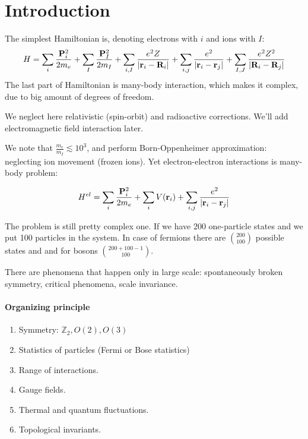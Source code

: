 \section{Introduction}
The simplest Hamiltonian is, denoting electrons with $i$ and ions with $I$: 
\begin{align}
H = \sum_i \frac{\vb{P}_i^2}{2m_e} +  \sum_I \frac{\vb{P}_I^2}{2m_I} +  \sum_{i,I} \frac{e^2Z}{\abs{\vb{r}_i - \vb{R}_i}} +  \sum_{i,j} \frac{e^2}{\abs{\vb{r}_i - \vb{r}_j}}+  \sum_{I,J} \frac{e^2Z^2}{\abs{\vb{R}_i - \vb{R}_j}}
\end{align}
The last part of Hamiltonian is many-body interaction, which makes it complex, due to big amount of degrees of freedom. 

We neglect here relativistic (spin-orbit) and radioactive corrections. We'll add electromagnetic field interaction later.

We note that $\frac{m_e}{m_I} \lesssim 10^3$, and perform Born-Oppenheimer approximation: neglecting ion movement (frozen ions). Yet electron-electron interactions is many-body problem:

\begin{align}
H^{el} = \sum_i \frac{\vb{P}_i^2}{2m_e} +  \sum_i V\qty(\vb{r}_i) + \sum_{i,j} \frac{e^2}{\abs{\vb{r}_i - \vb{r}_j}}
\end{align}

The problem is still pretty complex one. If we have 200 one-particle states and we put 100 particles in the system. In case of fermions there are $\binom{200}{100}$ possible states and and for bosons $\binom{200+100-1}{100}$.

There are phenomena that happen only in large scale: spontaneously broken symmetry, critical phenomena, scale invariance.

\paragraph{Organizing principle}
\begin{enumerate}
	\item Symmetry: $\mathbb{Z}_2, O(2), O(3)$
	\item Statistics of particles (Fermi or Bose statistics)
	\item Range of interactions.
	\item Gauge fields. 
	\item Thermal and quantum fluctuations.
	\item Topological invariants.
\end{enumerate}

